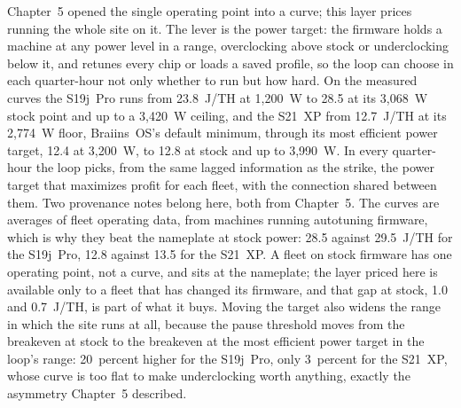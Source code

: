 Chapter~5 opened the single operating point into a curve; this layer prices running the whole site on it. The lever is the power target: the firmware holds a machine at any power level in a range, overclocking above stock or underclocking below it, and retunes every chip or loads a saved profile, so the loop can choose in each quarter-hour not only whether to run but how hard. On the measured curves the S19j~Pro runs from 23.8~J/TH at 1,200~W to 28.5 at its 3,068~W stock point and up to a 3,420~W ceiling, and the S21~XP from 12.7~J/TH at its 2,774~W floor, Braiins~OS's default minimum, through its most efficient power target, 12.4 at 3,200~W, to 12.8 at stock and up to 3,990~W. In every quarter-hour the loop picks, from the same lagged information as the strike, the power target that maximizes profit for each fleet, with the connection shared between them. %
Two provenance notes belong here, both from Chapter~5. The curves are averages of fleet operating data, from machines running autotuning firmware, which is why they beat the nameplate at stock power: 28.5 against 29.5~J/TH for the S19j~Pro, 12.8 against 13.5 for the S21~XP. A fleet on stock firmware has one operating point, not a curve, and sits at the nameplate; the layer priced here is available only to a fleet that has changed its firmware, and that gap at stock, 1.0 and 0.7~J/TH, is part of what it buys. %
Moving the target also widens the range in which the site runs at all, because the pause threshold moves from the breakeven at stock to the breakeven at the most efficient power target in the loop's range: 20~percent higher for the S19j~Pro, only 3~percent for the S21~XP, whose curve is too flat to make underclocking worth anything, exactly the asymmetry Chapter~5 described. %
